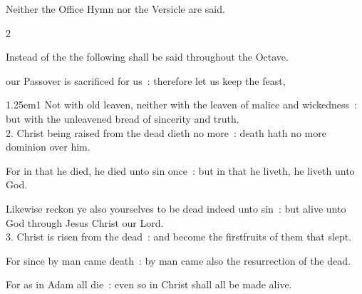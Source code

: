 
\begin{rubric}
	Neither the Office Hymn nor the Versicle are said.
\end{rubric}


\mattins


\begin{paracol}{2}
\sloppy

\label{PaschaNostrum}
{\begin{rubric}
    Instead of the  the following shall be said throughout the Octave.
\end{rubric}}

 our Passover is sacrificed for us~: therefore let us keep the feast,
    
\begin{hangparas}{1.25em}{1}
Not with old leaven, neither with the leaven of malice and wickedness~: but with the unleavened bread of sincerity and truth. \\

2. Christ being raised from the dead dieth no more~: death hath no more dominion over him.
    
For in that he died, he died unto sin once~: but in that he liveth, he liveth unto God.

    Likewise reckon ye also yourselves to be dead indeed unto sin~: but alive unto God through Jesus Christ our Lord. \\

3. Christ is risen from the dead~: and become the firstfruits of them that slept.

For since by man came death~: by man came also the resurrection of the dead.

For as in Adam all die~: even so in Christ shall all be made alive. \\
\end{hangparas}


\end{paracol}
